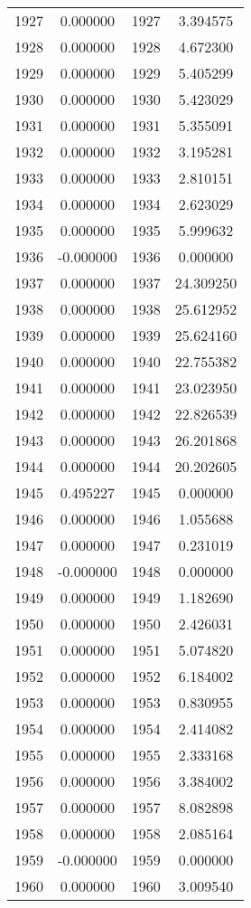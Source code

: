 \documentclass[12pt]{article}
\begin{document}
\begin{longtable}{@{}cccc@{}}
1927 & 0.000000 & 1927 & 3.394575 \\
1928 & 0.000000 & 1928 & 4.672300 \\
1929 & 0.000000 & 1929 & 5.405299 \\
1930 & 0.000000 & 1930 & 5.423029 \\
1931 & 0.000000 & 1931 & 5.355091 \\
1932 & 0.000000 & 1932 & 3.195281 \\
1933 & 0.000000 & 1933 & 2.810151 \\
1934 & 0.000000 & 1934 & 2.623029 \\
1935 & 0.000000 & 1935 & 5.999632 \\
1936 & -0.000000 & 1936 & 0.000000 \\
1937 & 0.000000 & 1937 & 24.309250 \\
1938 & 0.000000 & 1938 & 25.612952 \\
1939 & 0.000000 & 1939 & 25.624160 \\
1940 & 0.000000 & 1940 & 22.755382 \\
1941 & 0.000000 & 1941 & 23.023950 \\
1942 & 0.000000 & 1942 & 22.826539 \\
1943 & 0.000000 & 1943 & 26.201868 \\
1944 & 0.000000 & 1944 & 20.202605 \\
1945 & 0.495227 & 1945 & 0.000000 \\
1946 & 0.000000 & 1946 & 1.055688 \\
1947 & 0.000000 & 1947 & 0.231019 \\
1948 & -0.000000 & 1948 & 0.000000 \\
1949 & 0.000000 & 1949 & 1.182690 \\
1950 & 0.000000 & 1950 & 2.426031 \\
1951 & 0.000000 & 1951 & 5.074820 \\
1952 & 0.000000 & 1952 & 6.184002 \\
1953 & 0.000000 & 1953 & 0.830955 \\
1954 & 0.000000 & 1954 & 2.414082 \\
1955 & 0.000000 & 1955 & 2.333168 \\
1956 & 0.000000 & 1956 & 3.384002 \\
1957 & 0.000000 & 1957 & 8.082898 \\
1958 & 0.000000 & 1958 & 2.085164 \\
1959 & -0.000000 & 1959 & 0.000000 \\
1960 & 0.000000 & 1960 & 3.009540 \\

\end{longtable}
\end{document}
